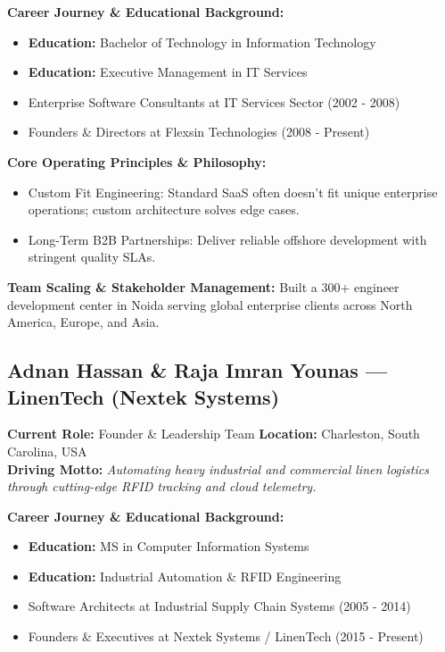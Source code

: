 \documentclass[11pt,a4paper]{article}
\begin{document}
\textbf{Career Journey \& Educational Background:}
\begin{itemize}[leftmargin=*]
    \item \textbf{Education:} Bachelor of Technology in Information Technology
    \item \textbf{Education:} Executive Management in IT Services
    \item Enterprise Software Consultants at IT Services Sector (2002 - 2008)
    \item Founders \& Directors at Flexsin Technologies (2008 - Present)
\end{itemize}

\textbf{Core Operating Principles \& Philosophy:}
\begin{itemize}[leftmargin=*]
    \item Custom Fit Engineering: Standard SaaS often doesn't fit unique enterprise operations; custom architecture solves edge cases.
    \item Long-Term B2B Partnerships: Deliver reliable offshore development with stringent quality SLAs.
\end{itemize}

\textbf{Team Scaling \& Stakeholder Management:} Built a 300+ engineer development center in Noida serving global enterprise clients across North America, Europe, and Asia.

\subsection{Adnan Hassan \& Raja Imran Younas --- LinenTech (Nextek Systems)}
\textbf{Current Role:} Founder \& Leadership Team \quad \textbf{Location:} Charleston, South Carolina, USA\\
\textbf{Driving Motto:} \textit{Automating heavy industrial and commercial linen logistics through cutting-edge RFID tracking and cloud telemetry.}

\textbf{Career Journey \& Educational Background:}
\begin{itemize}[leftmargin=*]
    \item \textbf{Education:} MS in Computer Information Systems
    \item \textbf{Education:} Industrial Automation \& RFID Engineering
    \item Software Architects at Industrial Supply Chain Systems (2005 - 2014)
    \item Founders \& Executives at Nextek Systems / LinenTech (2015 - Present)
\end{itemize}
\end{document}
